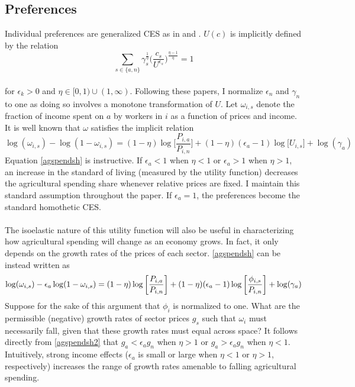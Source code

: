 \documentclass[]{article}
\theoremstyle{plain}
\begin{document}
\subsection*{Preferences}
Individual preferences are generalized CES as in \citet{cominetal2021} and \citet{engelslawglobal}. $U(c)$ is implicitly defined by the relation 
\begin{equation}\label{preferences}
	\sum_{s \in \{a, n\}}\gamma_{s}^{\frac{1}{\eta}}\bigg(\frac{c_{s}}{U^{\epsilon_{s}}}\bigg)^{\frac{\eta - 1}{\eta}} = 1
\end{equation}
\paragraph*{}
 for $\epsilon_{k} > 0$ and $\eta \in [0, 1)\cup(1, \infty) $. Following these papers, I normalize $\epsilon_{n}$ and $\gamma_{n}$ to one as doing so involves a monotone transformation of $U$. Let $\omega_{i,s}$ denote the fraction of income spent on $a$ by workers in $i$ as a function of prices and income. It is well known that $\omega$ satisfies the implicit relation
\begin{equation}\label{agspendsh}
	\log(\omega_{i,s}) - \log(1-\omega_{i,s}) = (1-\eta)\log\bigg[\frac{P_{i,a}}{P_{i,n}}\bigg] + (1-\eta)(\epsilon_{a} - 1)\log\big[U_{i,s}\big] + \log(\gamma_{a})
\end{equation}
Equation \eqref{agspendsh} is instructive. If $\epsilon_{a} < 1$ when $\eta < 1$ or $\epsilon_{a} > 1$ when $\eta > 1$, an increase in the standard of living (measured by the utility function) decreases the agricultural spending share whenever relative prices are fixed. I maintain this standard assumption throughout the paper. If $\epsilon_{a} = 1$, the preferences become the standard homothetic CES. 
\paragraph*{}
The isoelastic nature of this utility function will also be useful in characterizing how agricultural spending will change as an economy grows. In fact, it only depends on the growth rates of the prices of each sector. \eqref{agspendsh} can be instead written as 
\begin{equation} \label{agspendsh2}
	\small
	\log(\omega_{i,s}) - \epsilon_{a}\log(1-\omega_{i,s}) = (1-\eta)\log\bigg[\frac{P_{i,a}}{P_{i,n}}\bigg] + (1-\eta)(\epsilon_{a} - 1)\log\bigg[\frac{\phi_{i, s}}{P_{i, n}}\bigg] + \log(\gamma_{a})
\end{equation}
Suppose for the sake of this argument that $\phi_{i}$ is normalized to one. What are the permissible (negative) growth rates of sector prices $g_{s}$ such that $\omega_{i}$ must necessarily fall, given that these growth rates must equal across space? It follows directly from \eqref{agspendsh2} that $g_{a} < \epsilon_{a}g_{n}$ when $\eta > 1$ or $g_{a} > \epsilon_{a}g_{n}$ when $\eta < 1$. Intuitively, strong income effects ($\epsilon_{a}$ is small or large when $\eta < 1$ or $\eta > 1$, respectively) increases the range of growth rates amenable to falling agricultural spending. 
\end{document}
